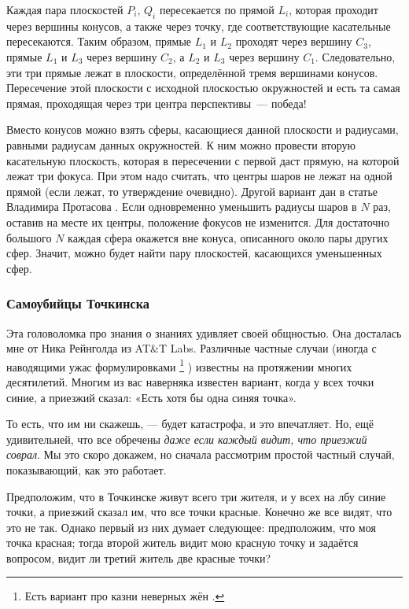 Каждая пара плоскостей $P_i$, $Q_i$ пересекается по прямой $L_i$, которая проходит через вершины конусов, а также через точку, где соответствующие касательные пересекаются.
Таким образом, прямые $L_1$ и $L_2$ проходят через вершину $C_3$,
прямые $L_1$ и $L_3$ через вершину $C_2$,
а $L_2$ и $L_3$ через вершину $C_1$.
Следовательно, эти три прямые лежат в плоскости, определённой тремя вершинами конусов. Пересечение этой плоскости с исходной плоскостью окружностей и есть та самая прямая, проходящая через три центра перспективы~--- победа!

\begin{addedbytheeditors}
Вместо конусов можно взять сферы, касающиеся данной плоскости и радиусами, равными радиусам данных окружностей.
К ним можно провести вторую касательную плоскость, которая в пересечении с первой даст прямую, на которой лежат три фокуса.
При этом надо считать, что центры шаров не лежат на одной прямой (если лежат, то утверждение очевидно).
Другой вариант дан в статье Владимира Протасова \cite{protasov}.
Если одновременно уменьшить радиусы шаров в $N$ раз, оставив на месте их центры, положение фокусов не изменится.
Для достаточно большого $N$ каждая сфера окажется вне конуса, описанного около  пары других сфер.
Значит, можно будет найти пару плоскостей, касающихся уменьшенных сфер.



\pr
\end{addedbytheeditors}

\subsubsection*{Самоубийцы Точкинска}

Эта головоломка про знания о знаниях удивляет своей общностью.
Она досталась мне от Ника Рейнголда из AT\&T Labs.
Различные частные случаи (иногда с наводящими ужас формулировками%
\footnote{Есть вариант про казни неверных жён \cite[1E]{halmos}.\pr}%
) известны на протяжении многих десятилетий.
Многим из вас наверняка известен вариант, когда у всех точки синие, а приезжий сказал: «Есть хотя бы одна синяя точка».

То есть, что им ни скажешь, --- будет катастрофа, и это впечатляет.
Но, ещё удивительней, что все обречены  \emph{даже если каждый видит, что приезжий соврал}. 
Мы это скоро докажем, но сначала рассмотрим простой частный случай, показывающий, как это работает.

Предположим, что в Точкинске живут всего три жителя, и у всех на лбу синие точки, а приезжий сказал им, что все точки красные.
Конечно же все видят, что это не так.
Однако первый из них думает следующее: предположим, что моя точка красная; тогда второй житель видит мою красную точку и задаётся вопросом, видит ли третий житель две красные точки?


